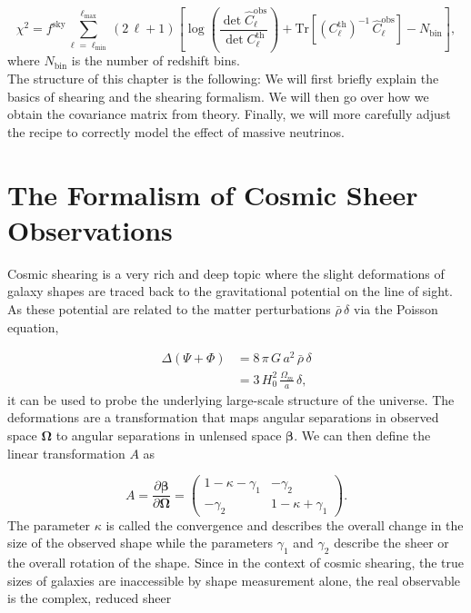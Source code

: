 \documentclass[../main.tex]{subfiles}
\begin{document}
\begin{equation}
    \chi^2 = f^\mathrm{sky} \sum_{\ell=\ell_\mathrm{min}}^{\ell_\mathrm{max}} (2\,\ell+1)\left[\log\left(\frac{\det \hat{C}_\ell^\mathrm{obs}}{\det C_\ell^\mathrm{th}}\right) + \mathrm{Tr}\left[\left(C_\ell^\mathrm{th}\right)^{-1}\,\hat{C}^\mathrm{obs}_\ell\right]-N_\mathrm{bin}\right],
\end{equation}
where $N_\mathrm{bin}$ is the number of redshift bins.\\
The structure of this chapter is the following: We will first briefly explain the basics of shearing and the shearing formalism. We will then go over how we obtain the covariance matrix from theory. Finally, we will more carefully adjust the recipe to correctly model the effect of massive neutrinos.

\section{The Formalism of Cosmic Sheer Observations}
Cosmic shearing is a very rich and deep topic where the slight deformations of galaxy shapes are traced back to the gravitational potential on the line of sight. As these potential are related to the matter perturbations $\bar{\rho}\,\delta$ via the Poisson equation, 

\begin{align*}
    \Delta (\Psi+\Phi) &= 8\,\pi\, G\,a^2\,\bar{\rho}\,\delta\\
                       &= 3\, H_0^2\, \frac{\Omega_m}{a}\, \delta,
\end{align*}
it can be used to probe the underlying large-scale structure of the universe. The deformations are a transformation that maps angular separations in observed space $\boldsymbol{\Omega}$ to angular separations in unlensed space $\boldsymbol{\beta}$. We can then define the linear transformation $A$ as 

\begin{equation}
    A = \frac{\partial \boldsymbol{\beta}}{\partial \boldsymbol{\Omega}} = \left(\begin{array}{cc}
        1-\kappa-\gamma_1 & -\gamma_2\\
        -\gamma_2 & 1-\kappa+\gamma_1        
    \end{array} \right).
\end{equation}
The parameter $\kappa$ is called the convergence and describes the overall change in the size of the observed shape while the parameters $\gamma_1$ and $\gamma_2$ describe the sheer or the overall rotation of the shape. Since in the context of cosmic shearing, the true sizes of galaxies are inaccessible by shape measurement alone, the real observable is the complex, reduced sheer 
\end{document}
